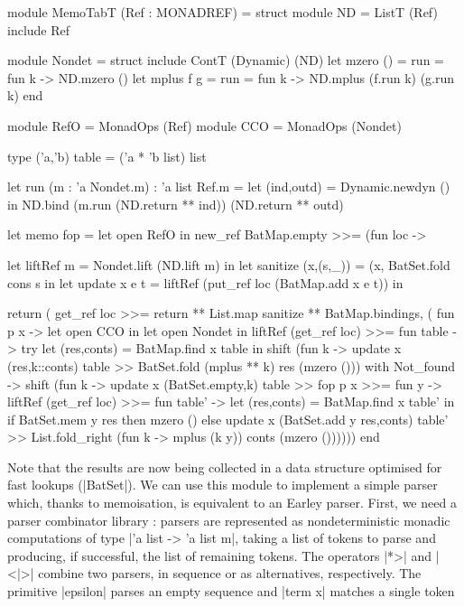 \begin{ocaml}
	module MemoTabT (Ref : MONADREF) = struct
		module ND = ListT (Ref)
		include Ref

		module Nondet = struct
			include ContT (Dynamic) (ND)
			let mzero ()  = {{run = fun k -> ND.mzero ()}}
			let mplus f g = {{run = fun k -> ND.mplus (f.run k) (g.run k)}}
		end

		module RefO = MonadOps (Ref)
		module CCO = MonadOps (Nondet)

		type ('a,'b) table = ('a * 'b list) list

		let run (m : 'a Nondet.m) : 'a list Ref.m =
			let (ind,outd) = Dynamic.newdyn () in
			ND.bind (m.run (ND.return ** ind)) (ND.return ** outd)

		let memo fop = let open RefO in 
			new_ref BatMap.empty >>= (fun loc ->

			let liftRef m  = Nondet.lift (ND.lift m) in
			let sanitize (x,(s,_)) = (x, BatSet.fold cons s {} in
			let update x e t = liftRef (put_ref loc (BatMap.add x e t)) in

			return (
				get_ref loc >>= return ** List.map sanitize ** BatMap.bindings, 
				( fun p x -> let open CCO in let open Nondet in
						liftRef (get_ref loc) >>= fun table ->
						try let (res,conts) = BatMap.find x table in
							shift (fun k -> update x (res,k::conts) table >>
															BatSet.fold (mplus ** k) res (mzero ()))
						with Not_found ->
							shift (fun k -> update x (BatSet.empty,{k}) table >>
															fop p x >>= fun y ->
															liftRef (get_ref loc) >>= fun table' ->
															let (res,conts) = BatMap.find x table' in
															if BatSet.mem y res then mzero ()
															else update x (BatSet.add y res,conts) table' >>
																	 List.fold_right (fun k -> mplus (k y)) 
																									 conts (mzero ())))))
	end
\end{ocaml}
Note that the results are now being collected in a data structure optimised for fast lookups (|BatSet|).
We can use this module to implement a simple parser which, thanks to
memoisation, is equivalent to an Earley parser. First, we need a parser
combinator library \cite{Hutton1990}: parsers are represented as nondeterministic
monadic computations of type |'a list -> 'a list m|, taking a list of tokens to 
parse and producing, if successful, the list of remaining tokens. The operators 
|*>| and |<|>| combine two parsers, in sequence or as alternatives, respectively.
The primitive |epsilon| parses an empty sequence and |term x| matches a single token
